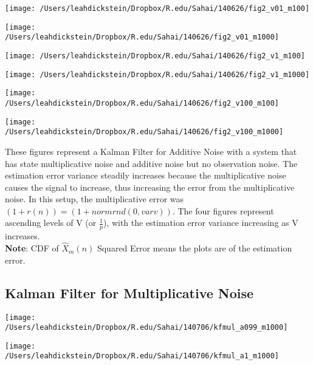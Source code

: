 \documentclass[leqno,twocolumn]{article}
\begin{document}
\begin{minipage}[c]{0.5\textwidth}
\texttt{[image: /Users/leahdickstein/Dropbox/R.edu/Sahai/140626/fig2\_v01\_m100]}
\end{minipage}
\begin{minipage}[c]{0.5\textwidth}
\texttt{[image: /Users/leahdickstein/Dropbox/R.edu/Sahai/140626/fig2\_v01\_m1000]}
\end{minipage}

\begin{minipage}[c]{0.5\textwidth}
\texttt{[image: /Users/leahdickstein/Dropbox/R.edu/Sahai/140626/fig2\_v1\_m100]}
\end{minipage}
\begin{minipage}[c]{0.5\textwidth}
\texttt{[image: /Users/leahdickstein/Dropbox/R.edu/Sahai/140626/fig2\_v1\_m1000]}
\end{minipage}

\begin{minipage}[c]{0.5\textwidth}
\texttt{[image: /Users/leahdickstein/Dropbox/R.edu/Sahai/140626/fig2\_v100\_m100]}
\end{minipage}
\begin{minipage}[c]{0.5\textwidth}
\texttt{[image: /Users/leahdickstein/Dropbox/R.edu/Sahai/140626/fig2\_v100\_m1000]}
\end{minipage}

These figures represent a Kalman Filter for Additive Noise with a system that has state multiplicative noise and additive noise but no observation noise. The estimation error variance steadily increases because the multiplicative noise causes the signal to increase, thus increasing the error from the multiplicative noise. In this setup, the multiplicative error was $(1+r(n)) = (1+normrnd(0,varv))$. The four figures represent ascending levels of V (or $\frac{1}{p}$), with the estimation error variance increasing as V increases.\\
\textbf{Note}: CDF of $\hat{X}_m(n)$ Squared Error means the plots are of the estimation error.

\subsection{Kalman Filter for Multiplicative Noise}
\begin{minipage}[c]{0.5\textwidth}
\texttt{[image: /Users/leahdickstein/Dropbox/R.edu/Sahai/140706/kfmul\_a099\_m1000]}
\end{minipage}
\begin{minipage}[c]{0.5\textwidth}
\texttt{[image: /Users/leahdickstein/Dropbox/R.edu/Sahai/140706/kfmul\_a1\_m1000]}
\end{minipage}
\end{document}
